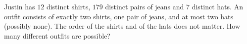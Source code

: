 Justin has $12$ distinct shirts, $179$ distinct pairs of jeans and $7$ distinct hats. An outfit consists of exactly two shirts, one pair of jeans, and at most two hats (possibly none). The order of the shirts and of the hats does not matter. How many different outfits are possible?
